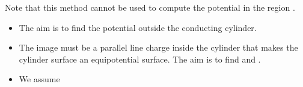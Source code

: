 \begin{ELremark}{}

Note that this method cannot be used to compute the potential in the region .

\end{ELremark}

\ELhold


\begin{ELunit}


\end{ELunit}

\begin{ELjoin}

\begin{itemize}
\tightlist
\item
  The aim is to find the potential outside the conducting cylinder.
\item
  The image must be a parallel line charge inside the cylinder that makes the cylinder surface  an equipotential surface. The aim is to find  and .
\item
  We assume
\end{itemize}

\begin{ELimportant}{}


\end{ELimportant}

\end{ELjoin}

